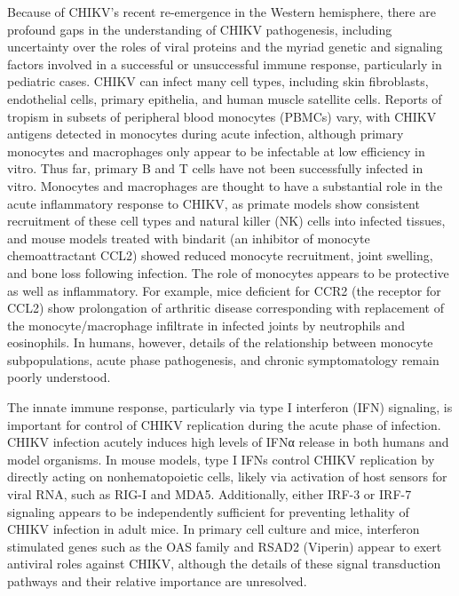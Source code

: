 Because of CHIKV’s recent re-emergence in the Western hemisphere, there are profound gaps in the understanding of CHIKV pathogenesis, including uncertainty over the roles of viral proteins and the myriad genetic and signaling factors involved in a successful or unsuccessful immune response, particularly in pediatric cases.\autocite{Teng2015} CHIKV can infect many cell types, including skin fibroblasts, endothelial cells, primary epithelia, and human muscle satellite cells.\autocite{Couderc2015,Lum2015} Reports of tropism in subsets of peripheral blood monocytes (PBMCs) vary, with CHIKV antigens detected in monocytes during acute infection,\autocite{Her2010} although primary monocytes and macrophages only appear to be infectable at low efficiency in vitro.\autocite{Sourisseau2007,Teng2012a} Thus far, primary B and T cells have not been successfully infected in vitro.\autocite{Her2010,Sourisseau2007,Teng2012a} Monocytes and macrophages are thought to have a substantial role in the acute inflammatory response to CHIKV, as primate models show consistent recruitment of these cell types and natural killer (NK) cells into infected tissues,\autocite{Labadie2010} and mouse models treated with bindarit (an inhibitor of monocyte chemoattractant CCL2) showed reduced monocyte recruitment, joint swelling, and bone loss following infection.\autocite{Chen2015,Rulli2011} The role of monocytes appears to be protective as well as inflammatory. For example, mice deficient for CCR2 (the receptor for CCL2) show prolongation of arthritic disease corresponding with replacement of the monocyte/macrophage infiltrate in infected joints by neutrophils and eosinophils.\autocite{Poo2014} In humans, however, details of the relationship between monocyte subpopulations, acute phase pathogenesis, and chronic symptomatology remain poorly understood.\autocite{Burt2017,Weaver2015}

The innate immune response, particularly via type I interferon (IFN) signaling, is important for control of CHIKV replication during the acute phase of infection.\autocite{Burt2017,Schilte2010} CHIKV infection acutely induces high levels of IFNα release in both humans and model organisms.\autocite{Labadie2010,Teng2015} In mouse models, type I IFNs control CHIKV replication by directly acting on nonhematopoietic cells, likely via activation of host sensors for viral RNA, such as RIG-I and MDA5.\autocite{Schilte2010} Additionally, either IRF-3 or IRF-7 signaling appears to be independently sufficient for preventing lethality of CHIKV infection in adult mice.\autocite{Schilte2012} In primary cell culture and mice, interferon stimulated genes such as the OAS family and RSAD2 (Viperin) appear to exert antiviral roles against CHIKV, although the details of these signal transduction pathways and their relative importance are unresolved.\autocite{Burt2017}

